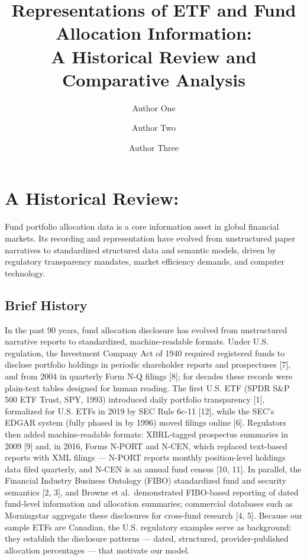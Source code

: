 \documentclass[sigconf]{acmart}
\begin{document}
\title{Representations of ETF and Fund Allocation Information:\\
A Historical Review and Comparative Analysis}

\author{Author One}
\author{Author Two}
\author{Author Three}

\section{A Historical Review:}

Fund portfolio allocation data is a core information asset in global
financial markets. Its recording and representation have evolved from
unstructured paper narratives to standardized structured data and semantic
models, driven by regulatory transparency mandates, market efficiency
demands, and computer technology.

\subsection{Brief History}

In the past 90 years, fund allocation disclosure has evolved from
unstructured narrative reports to standardized, machine-readable formats.
Under U.S. regulation, the Investment Company Act of 1940 required
registered funds to disclose portfolio holdings in periodic shareholder
reports and prospectuses [7], and from 2004 in quarterly Form N-Q filings
[8]; for decades these records were plain-text tables designed for human
reading. The first U.S. ETF (SPDR S\&P 500 ETF Trust, SPY, 1993)
introduced daily portfolio transparency [1], formalized for U.S. ETFs in
2019 by SEC Rule 6c-11 [12], while the SEC's EDGAR system (fully phased in
by 1996) moved filings online [6]. Regulators then added machine-readable
formats: XBRL-tagged prospectus summaries in 2009 [9] and, in 2016, Forms
N-PORT and N-CEN, which replaced text-based reports with XML filings ---
N-PORT reports monthly position-level holdings data filed quarterly, and
N-CEN is an annual fund census [10, 11]. In parallel, the Financial
Industry Business Ontology (FIBO) standardized fund and security semantics
[2, 3], and Browne et al.\ demonstrated FIBO-based reporting of dated
fund-level information and allocation summaries; commercial databases such
as Morningstar aggregate these disclosures for cross-fund research [4, 5].
Because our sample ETFs are Canadian, the U.S. regulatory examples serve
as background: they establish the disclosure patterns --- dated,
structured, provider-published allocation percentages --- that motivate
our model.
\end{document}
